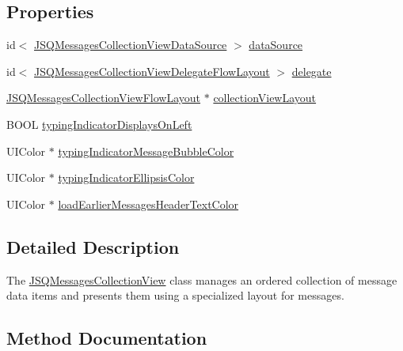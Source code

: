 \subsection*{Properties}
\begin{DoxyCompactItemize}
\item 
id$<$ \hyperlink{protocol_j_s_q_messages_collection_view_data_source-p}{J\+S\+Q\+Messages\+Collection\+View\+Data\+Source} $>$ \hyperlink{interface_j_s_q_messages_collection_view_ab2d7a72bc1b6d267cd69e615c4965c2a}{data\+Source}
\item 
id$<$ \hyperlink{protocol_j_s_q_messages_collection_view_delegate_flow_layout-p}{J\+S\+Q\+Messages\+Collection\+View\+Delegate\+Flow\+Layout} $>$ \hyperlink{interface_j_s_q_messages_collection_view_ac00c8069a3335df10da0bf609b27ef74}{delegate}
\item 
\hyperlink{interface_j_s_q_messages_collection_view_flow_layout}{J\+S\+Q\+Messages\+Collection\+View\+Flow\+Layout} $\ast$ \hyperlink{interface_j_s_q_messages_collection_view_a5f685c56a4ef349a6ad8fa04f8915c64}{collection\+View\+Layout}
\item 
B\+O\+O\+L \hyperlink{interface_j_s_q_messages_collection_view_a00d402fe933028dbf2c112c1637660dc}{typing\+Indicator\+Displays\+On\+Left}
\item 
U\+I\+Color $\ast$ \hyperlink{interface_j_s_q_messages_collection_view_a90851cfff181102d505f4df2e784eef8}{typing\+Indicator\+Message\+Bubble\+Color}
\item 
U\+I\+Color $\ast$ \hyperlink{interface_j_s_q_messages_collection_view_a5a31d52d9d888bdae722bf7e0239a052}{typing\+Indicator\+Ellipsis\+Color}
\item 
U\+I\+Color $\ast$ \hyperlink{interface_j_s_q_messages_collection_view_ad49ab227a62c4a2a90a24400123d8f43}{load\+Earlier\+Messages\+Header\+Text\+Color}
\end{DoxyCompactItemize}


\subsection{Detailed Description}
The {\ttfamily \hyperlink{interface_j_s_q_messages_collection_view}{J\+S\+Q\+Messages\+Collection\+View}} class manages an ordered collection of message data items and presents them using a specialized layout for messages. 

\subsection{Method Documentation}
\hypertarget{interface_j_s_q_messages_collection_view_acc03239285b071c874653f7774faa7e0}{}
